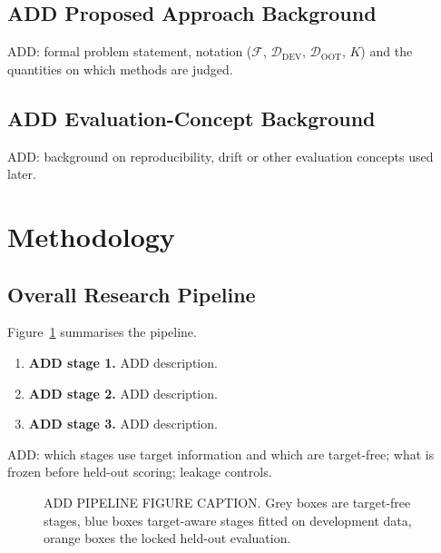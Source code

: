 \documentclass[final,5p,twocolumn]{elsarticle}
\newcommand{\Kfeat}{K}
\begin{document}
\subsection{ADD Proposed Approach Background}
\label{subsec:proposed_background}
ADD: formal problem statement, notation ($\mathcal{F}$, $\mathcal{D}_{\mathrm{DEV}}$, $\mathcal{D}_{\mathrm{OOT}}$, $\Kfeat$) and the quantities on which methods are judged.

\subsection{ADD Evaluation-Concept Background}
\label{subsec:evaluation_background}
ADD: background on reproducibility, drift or other evaluation concepts used later.


\section{Methodology}
\label{sec:methodology}

\subsection{Overall Research Pipeline}
\label{subsec:pipeline}

Figure~\ref{fig:pipeline} summarises the pipeline.
\begin{enumerate}
    \item \textbf{ADD stage 1.} ADD description.
    \item \textbf{ADD stage 2.} ADD description.
    \item \textbf{ADD stage 3.} ADD description.
\end{enumerate}
ADD: which stages use target information and which are target-free; what is frozen before held-out scoring; leakage controls.

\begin{figure}[htbp]
\centering
{}
\caption{ADD PIPELINE FIGURE CAPTION. Grey boxes are target-free stages, blue boxes target-aware stages fitted on development data, orange boxes the locked held-out evaluation.}
\label{fig:pipeline}
\end{figure}
\end{document}
